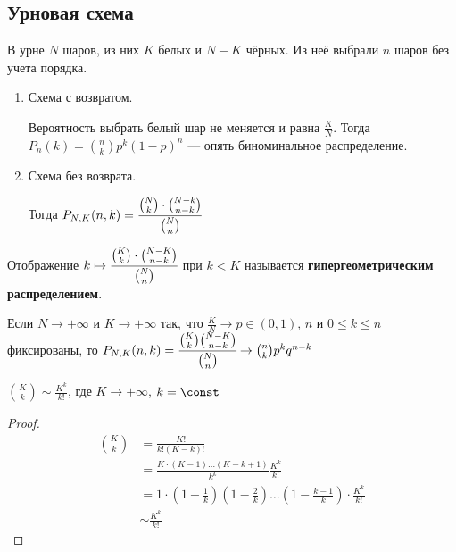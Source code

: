\documentclass[12pt, a4paper, oneside]{book}
\begin{document}
\subsection{Урновая схема}

В урне \(N\) шаров, из них \(K\) белых и \(N - K\) чёрных. Из неё выбрали \(n\) шаров без учета порядка.

\begin{enumerate}
    \item Схема с возвратом.

          Вероятность выбрать белый шар не меняется и равна \(\frac{K}{N}\). Тогда \(P_n(k) = \binom{n}{k}p^k(1 - p)^n\) --- опять биноминальное распределение.

    \item Схема без возврата.

          Тогда \(P_{N,K}(n, k) = \cfrac{\binom{N}{k} \cdot \binom{N - k}{n - k}}{\binom{N}{n}} \)
\end{enumerate}

\begin{definition}
    Отображение \(k \mapsto \cfrac{\binom{K}{k}\cdot \binom{N - K}{n - k}}{\binom{N}{n}}\) при \(k < K\) называется \textbf{гипергеометрическим распределением}.
\end{definition}

\begin{theorem}
    Если \(N \to +\infty\) и \(K \to +\infty\) так, что \(\frac{K}{N} \to p\in(0,1)\), \(n\) и \(0 \leq k \leq n\) фиксированы, то \(P_{N,K}(n,k) = \cfrac{\binom{K}{k}\binom{N - K}{n - k}}{\binom{N}{n}} \to \binom{n}{k}p^k q^{n - k}\)

    \label{урна бином}
\end{theorem}

\begin{lemma}
    \(\binom{K}{k} \sim \frac{K^k}{k!} \), где \(K \to +\infty\), \(k = \const\)
\end{lemma}
\begin{proof}
    \begin{align*}
        \binom{K}{k} & = \frac{K!}{k!(K - k)!}                                                                                                             \\
                     & = \frac{K\cdot(K - 1)\dots (K - k + 1)}{k^k}\frac{K^k}{k!}                                                                          \\
                     & = 1\cdot \left( 1 - \frac{1}{k} \right)\left( 1 - \frac{2}{k} \right) \dots \left( 1 - \frac{k - 1}{k} \right) \cdot \frac{K^k}{k!} \\
                     & \sim \frac{K^k}{k!}
    \end{align*}
\end{proof}
\end{document}

